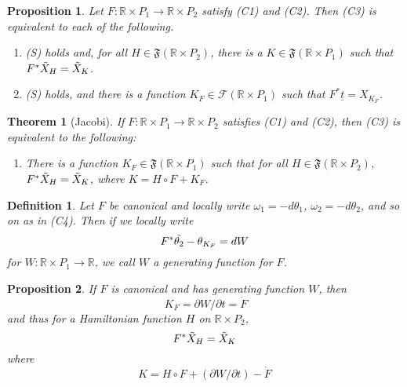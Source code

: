 \documentclass{article}
\newtheorem{thm}{Theorem}
\newtheorem{defn}{Definition}
\newtheorem{prop}{Proposition}
\begin{document}
\begin{prop}

    Let $F: \mathbb{R} \times P_1 \to \mathbb{R} \times P_2$ satisfy (C1) and (C2). Then (C3) is equivalent to each of the following.\\
    \begin{enumerate}

    \item[C6] (S) holds and, for all $H \in \mathfrak{F}(\mathbb{R} \times P_2)$, there is a $K \in \mathfrak{F}( \mathbb{R} \times P_1)$ such that $F^*\Tilde{X}_H = \Tilde{X}_K$.\\
    \item[C7] (S) holds, and there is a function $K_F \in \mathcal{F}(\mathbb{R} \times P_1)$ such that $F^*\underline{t}=X_{K_F}$.

    \end{enumerate}
\end{prop}

\begin{thm}[Jacobi]
    If $F: \mathbb{R} \times P_1 \to \mathbb{R} \times P_2$ satisfies (C1) and (C2), then (C3) is equivalent to the following:

    \begin{enumerate}
        \item[C8] There is a function $K_F \in \mathfrak{F}(\mathbb{R} \times P_1)$ such that for all $H \in \mathfrak{F}(\mathbb{R} \times P_2)$, $F^*\Tilde{X}_H = \Tilde{X}_K$, where $K = H \circ F + K_F$.
    \end{enumerate} 

\end{thm}

\begin{defn}

    Let $F$ be canonical and locally write $\omega_1 = - d\theta_1$, $\omega_2 = -d\theta_2$, and so on as in (C4). Then if we locally write 
    \[F^*\Tilde{\theta_2} - \theta_{K_F} = dW\]
    for $W: \mathbb{R} \times P_1 \to \mathbb{R}$, we call $W$ a generating function for $F$.

\end{defn}


\begin{prop}
    If $F$ is canonical and has generating function $W$, then\[\ K_F = \partial W / \partial t = \dot{F} \]
    and thus for a Hamiltonian function $H$ on $\mathbb{R} \times P_2$,
    \[ F^*\Tilde{X}_H = \Tilde{X}_K \]
    where
    \[ K = H \circ F + (\partial W / \partial t) - \dot{F} \]
\end{prop}
\end{document}
